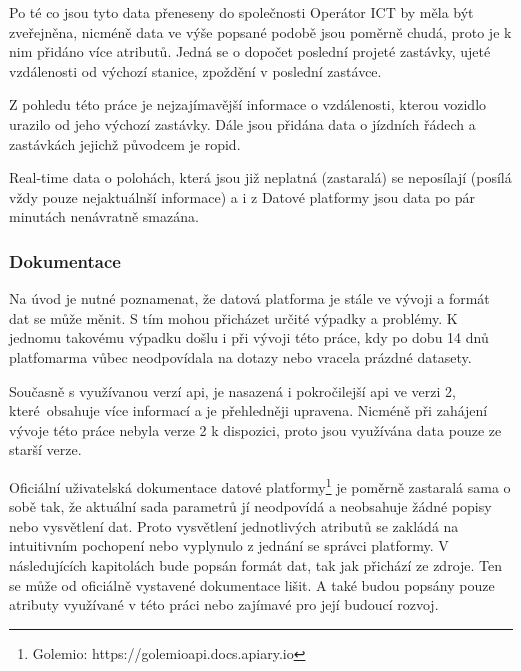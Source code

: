 \bigbreak

Po té co jsou tyto data přeneseny do společnosti Operátor ICT by měla být zveřejněna, nicméně data ve výše popsané podobě jsou poměrně chudá, proto je k nim přidáno více atributů. Jedná se o dopočet poslední projeté zastávky, ujeté vzdálenosti od výchozí stanice, zpoždění v poslední zastávce.

\bigbreak

 Z pohledu této práce je nejzajímavější informace o vzdálenosti, kterou vozidlo urazilo od jeho výchozí zastávky. Dále jsou přidána data o jízdních řádech a zastávkách jejichž původcem je \gls{ropid}.

\bigbreak

Real-time data o polohách, která jsou již neplatná (zastaralá) se neposílají (posílá vždy pouze nejaktuálnší informace) a i z Datové platformy jsou data po pár minutách nenávratně smazána.

\subsubsection{Dokumentace}

Na úvod je nutné poznamenat, že datová platforma je stále ve vývoji a formát dat se může měnit. S tím mohou přicházet určité výpadky a problémy. K jednomu takovému výpadku došlu i při vývoji této práce, kdy po dobu 14 dnů platfomarma vůbec neodpovídala na dotazy nebo vracela prázdné datasety.

\bigbreak

Současně s využívanou verzí \gls{api}, je nasazená i pokročilejší \gls{api} ve verzi 2, které obsahuje více informací a je přehledněji upravena. Nicméně při zahájení vývoje této práce nebyla verze 2 k dispozici, proto jsou využívána data pouze ze starší verze.

\bigbreak

Oficiální uživatelská dokumentace datové platformy\footnote{Golemio: https://golemioapi.docs.apiary.io} je poměrně zastaralá sama o sobě tak, že aktuální sada parametrů jí neodpovídá a neobsahuje žádné popisy nebo vysvětlení dat. Proto vysvětlení jednotlivých atributů se zakládá na intuitivním pochopení nebo vyplynulo z jednání se správci platformy. V následujících kapitolách bude popsán formát dat, tak jak přichází ze zdroje. Ten se může od oficiálně vystavené dokumentace lišit. A také budou popsány pouze atributy využívané v této práci nebo zajímavé pro její budoucí rozvoj.

\bigbreak

